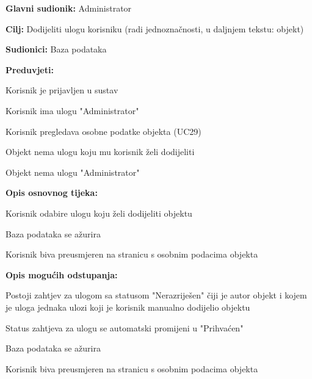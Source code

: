 					\noindent {}
					\begin{packed_item}
	
						\item \textbf{Glavni sudionik: }Administrator
						\item  \textbf{Cilj:} Dodijeliti ulogu korisniku (radi jednoznačnosti, u daljnjem tekstu: objekt)
						\item  \textbf{Sudionici:} Baza podataka
						\item  \textbf{Preduvjeti:}
						\item[] \begin{packed_enum}
							\item Korisnik je prijavljen u sustav
							\item Korisnik ima ulogu "Administrator"
							\item Korisnik pregledava osobne podatke objekta (UC29)
							\item Objekt nema ulogu koju mu korisnik želi dodijeliti
							\item Objekt nema ulogu "Administrator"
						\end{packed_enum}
						\item  \textbf{Opis osnovnog tijeka:}
						
						\item[] \begin{packed_enum}
	
							\item Korisnik odabire ulogu koju želi dodijeliti objektu
							\item Baza podataka se ažurira
							\item Korisnik biva preusmjeren na stranicu s osobnim podacima objekta
						\end{packed_enum}
						
						\item  \textbf{Opis mogućih odstupanja:}
						
						\item[] \begin{packed_item}
						\item[1.a] Postoji zahtjev za ulogom sa statusom "Nerazriješen" čiji je autor objekt i kojem je uloga jednaka ulozi koji je korisnik manualno dodijelio objektu
							\item[] \begin{packed_enum}
								
								\item Status zahtjeva za ulogu se automatski promijeni u "Prihvaćen"
								\item Baza podataka se ažurira
								\item Korisnik biva preusmjeren na stranicu s osobnim podacima objekta
								
							\end{packed_enum}
                    		\end{packed_item}		
						
					\end{packed_item}
					
